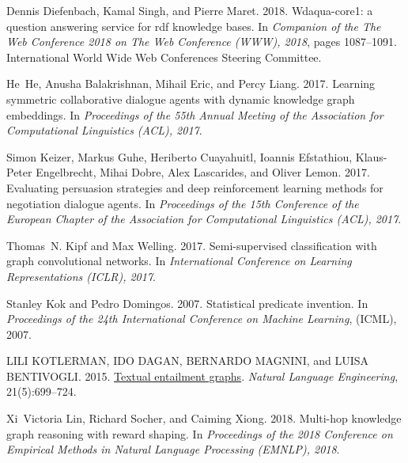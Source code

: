 \documentclass[11pt,a4paper]{article}
\begin{document}
\begin{thebibliography}{29}
Dennis Diefenbach, Kamal Singh, and Pierre Maret. 2018.
\newblock Wdaqua-core1: a question answering service for rdf knowledge bases.
\newblock In \emph{Companion of the The Web Conference 2018 on The Web
  Conference (WWW), 2018}, pages 1087--1091. International World Wide Web
  Conferences Steering Committee.

He~He, Anusha Balakrishnan, Mihail Eric, and Percy Liang. 2017.
\newblock Learning symmetric collaborative dialogue agents with dynamic
  knowledge graph embeddings.
\newblock In \emph{Proceedings of the 55th Annual Meeting of the Association
  for Computational Linguistics (ACL), 2017}.

Simon Keizer, Markus Guhe, Heriberto Cuayahuitl, Ioannis Efstathiou,
  Klaus-Peter Engelbrecht, Mihai Dobre, Alex Lascarides, and Oliver Lemon.
  2017.
\newblock Evaluating persuasion strategies and deep reinforcement learning
  methods for negotiation dialogue agents.
\newblock In \emph{Proceedings of the 15th Conference of the European Chapter
  of the Association for Computational Linguistics (ACL), 2017}.

Thomas~N. Kipf and Max Welling. 2017.
\newblock Semi-supervised classification with graph convolutional networks.
\newblock In \emph{International Conference on Learning Representations (ICLR),
  2017}.

Stanley Kok and Pedro Domingos. 2007.
\newblock Statistical predicate invention.
\newblock In \emph{Proceedings of the 24th International Conference on Machine
  Learning}, (ICML), 2007.

LILI KOTLERMAN, IDO DAGAN, BERNARDO MAGNINI, and LUISA BENTIVOGLI. 2015.
\newblock \href {https://doi.org/10.1017/S1351324915000108} {Textual entailment
  graphs}.
\newblock \emph{Natural Language Engineering}, 21(5):699–724.

Xi~Victoria Lin, Richard Socher, and Caiming Xiong. 2018.
\newblock Multi-hop knowledge graph reasoning with reward shaping.
\newblock In \emph{Proceedings of the 2018 Conference on Empirical Methods in
  Natural Language Processing (EMNLP), 2018}.


\end{thebibliography}
\end{document}

